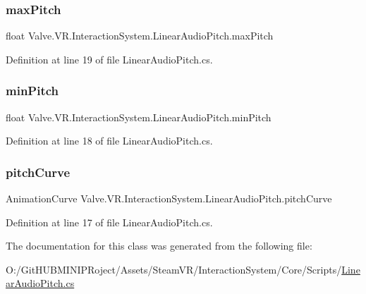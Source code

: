 \subsubsection{\texorpdfstring{maxPitch}{maxPitch}}
{\footnotesize\ttfamily float Valve.\+V\+R.\+Interaction\+System.\+Linear\+Audio\+Pitch.\+max\+Pitch}



Definition at line 19 of file Linear\+Audio\+Pitch.\+cs.

\mbox{\label{class_valve_1_1_v_r_1_1_interaction_system_1_1_linear_audio_pitch_a282682c2c1fc859dae276bda87fe6450}} 
\subsubsection{\texorpdfstring{minPitch}{minPitch}}
{\footnotesize\ttfamily float Valve.\+V\+R.\+Interaction\+System.\+Linear\+Audio\+Pitch.\+min\+Pitch}



Definition at line 18 of file Linear\+Audio\+Pitch.\+cs.

\mbox{\label{class_valve_1_1_v_r_1_1_interaction_system_1_1_linear_audio_pitch_ac283968cd08adf62b4a7077ba7a667c2}} 
\subsubsection{\texorpdfstring{pitchCurve}{pitchCurve}}
{\footnotesize\ttfamily Animation\+Curve Valve.\+V\+R.\+Interaction\+System.\+Linear\+Audio\+Pitch.\+pitch\+Curve}



Definition at line 17 of file Linear\+Audio\+Pitch.\+cs.



The documentation for this class was generated from the following file\+:\begin{DoxyCompactItemize}
\item 
O\+:/\+Git\+H\+U\+B\+M\+I\+N\+I\+P\+Roject/\+Assets/\+Steam\+V\+R/\+Interaction\+System/\+Core/\+Scripts/\mbox{\hyperlink{_linear_audio_pitch_8cs}{Linear\+Audio\+Pitch.\+cs}}\end{DoxyCompactItemize}
